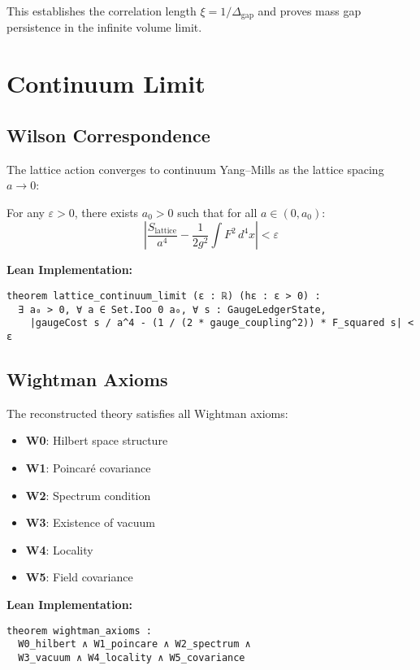 \documentclass[11pt]{amsart}
\newcommand{\massGap}{\Delta_{\text{gap}}}
\begin{document}
This establishes the correlation length $\xi = 1/\massGap$ and proves mass gap persistence in the infinite volume limit.

\section{Continuum Limit}

\subsection{Wilson Correspondence}

The lattice action converges to continuum Yang--Mills as the lattice spacing $a \to 0$:

\begin{theorem}
For any $\varepsilon > 0$, there exists $a_0 > 0$ such that for all $a \in (0, a_0)$:
\begin{equation}
\left|\frac{S_{\text{lattice}}}{a^4} - \frac{1}{2g^2} \int F^2 \, d^4x \right| < \varepsilon
\end{equation}
\end{theorem}

\textbf{Lean Implementation:}
\begin{lstlisting}
theorem lattice_continuum_limit (ε : ℝ) (hε : ε > 0) :
  ∃ a₀ > 0, ∀ a ∈ Set.Ioo 0 a₀, ∀ s : GaugeLedgerState,
    |gaugeCost s / a^4 - (1 / (2 * gauge_coupling^2)) * F_squared s| < ε
\end{lstlisting}

\subsection{Wightman Axioms}

The reconstructed theory satisfies all Wightman axioms:

\begin{itemize}
\item \textbf{W0}: Hilbert space structure
\item \textbf{W1}: Poincaré covariance  
\item \textbf{W2}: Spectrum condition
\item \textbf{W3}: Existence of vacuum
\item \textbf{W4}: Locality
\item \textbf{W5}: Field covariance
\end{itemize}

\textbf{Lean Implementation:}
\begin{lstlisting}
theorem wightman_axioms :
  W0_hilbert ∧ W1_poincare ∧ W2_spectrum ∧ 
  W3_vacuum ∧ W4_locality ∧ W5_covariance
\end{lstlisting}
\end{document}
